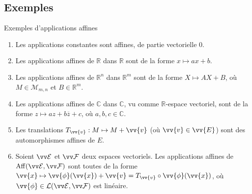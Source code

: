 \documentclass[bigger]{m53beamer}
\begin{document}
\subsection{Exemples}
  \begin{frame}{Exemples d'applications affines}
    \begin{enumerate}[<+(1)->]
      \item Les applications constantes sont affines, de partie vectorielle $0$.
      \item Les applications affines de $\mathbb{R}$ dans $\mathbb{R}$ sont de la forme $x \mapsto ax+b$.
      \item Les applications affines de $\mathbb{R}^{n}$ dans $\mathbb{R}^{m}$ sont de la forme $X \mapsto AX+B$, où $M \in \mathcal{M}_{m,n}$ et $B \in \mathbb{R}^{m}$.
      \item Les applications affines de $\mathbb{C}$ dans $\mathbb{C}$, vu comme $\mathbb{R}$-espace vectoriel, sont de la forme $z \mapsto az+b\overline{z}+c$, où $a,b,c \in \mathbb{C}$.
      \item Les translations $T_{\vv{v}}:M \mapsto M+\vv{v}$ (où $\vv{v} \in \vv{E}$) sont des automorphismes affines de $E$.
      \item Soient $\ev{E}$ et $\ev{F}$ deux espaces vectoriels. Les applications affines de $\aff(\ev{E},\ev{F})$ sont toutes de la forme $\vv{x} \mapsto \vv{\phi}(\vv{x}) + \vv{v}=T_{\vv{v}}\circ\vv{\phi}(\vv{x})$, où $\vv{\phi} \in \lin(\ev{E},\ev{F})$ est linéaire.
    \end{enumerate}
  \end{frame}

\end{document}
